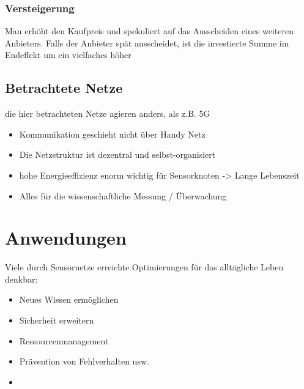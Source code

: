 \documentclass[a4paper]{article}
\begin{document}
\subsubsection{Versteigerung}
Man erhöht den Kaufpreis und spekuliert auf das Ausscheiden eines weiteren Anbieters. Falls der Anbieter spät ausscheidet, ist die investierte Summe im Endeffekt um ein vielfaches höher
\subsection{Betrachtete Netze}
die hier betrachteten Netze agieren anders, als z.B. 5G
\begin{itemize}
	\item Kommunikation geschieht nicht über Handy Netz
	\item Die Netzstruktur ist dezentral und selbst-organisiert
	\item hohe Energieeffizienz enorm wichtig für Sensorknoten -> Lange Lebenszeit
	\item Alles für die wissenschaftliche Messung / Überwachung
\end{itemize}

\section{Anwendungen}
Viele durch Sensornetze erreichte Optimierungen für das alltägliche Leben denkbar:
\begin{itemize}
	\item Neues Wissen ermöglichen
	\item Sicherheit erweitern
	\item Ressourcenmanagement
	\item Prävention von Fehlverhalten usw.
	\item[]
\end{itemize}
\end{document}
